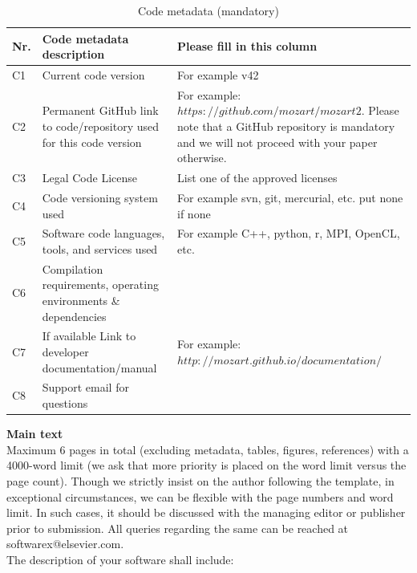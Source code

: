 \documentclass[preprint,12pt, a4paper]{elsarticle}
\begin{document}
\begin{table}[!h]
\begin{tabular}{|l|p{6.5cm}|p{6.5cm}|}
\hline
\textbf{Nr.} & \textbf{Code metadata description} & \textbf{Please fill in this column} \\
\hline
C1 & Current code version & For example v42 \\
\hline
C2 & Permanent GitHub link to code/repository used for this code version & For example: $https://github.com/mozart/mozart2$. Please note that a GitHub repository is mandatory and we will not proceed with your paper otherwise.\\
\hline
C3 & Legal Code License   & List one of the approved licenses \\
\hline
C4 & Code versioning system used & For example svn, git, mercurial, etc. put none if none \\
\hline
C5 & Software code languages, tools, and services used & For example C++, python, r, MPI, OpenCL, etc. \\
\hline
C6 & Compilation requirements, operating environments \& dependencies & \\
\hline
C7 & If available Link to developer documentation/manual & For example: $http://mozart.github.io/documentation/$ \\
\hline
C8 & Support email for questions & \\
\hline
\end{tabular}
\caption{Code metadata (mandatory)}
\label{} 
\end{table}

\textbf{Main text}\\

Maximum 6 pages in total (excluding metadata, tables, figures, references) with a
4000-word limit (we ask that more priority is placed on the word limit versus the page count). Though we strictly insist on the author following the template, in exceptional
circumstances, we can be flexible with the page numbers and word limit. In such cases, it should be
discussed with the managing editor or publisher prior to submission. All queries regarding the same can be reached at softwarex@elsevier.com.\\

The description of your software  shall include:
\end{document}
